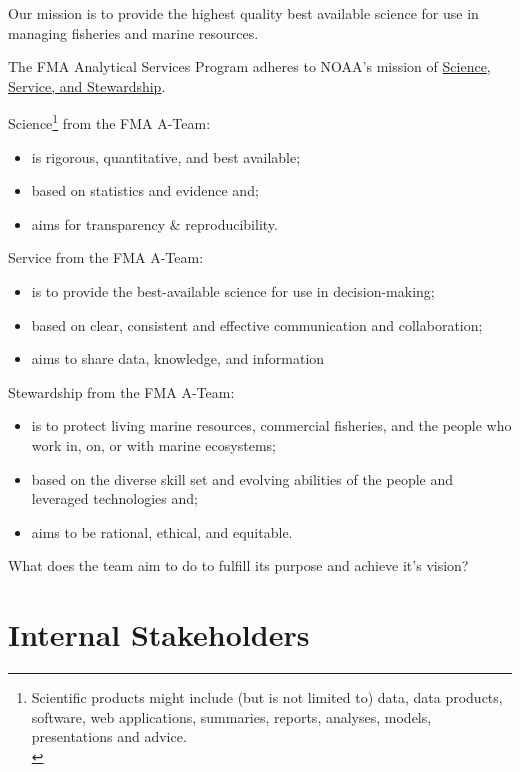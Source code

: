 \documentclass[
  letterpaper,
  DIV=11,
  numbers=noendperiod]{scrreprt}
\providecommand{\tightlist}{%
  \setlength{\itemsep}{0pt}\setlength{\parskip}{0pt}}\usepackage{longtable,booktabs,array}
\begin{document}
Our mission is to provide the highest quality best available science for
use in managing fisheries and marine resources.

The FMA Analytical Services Program adheres to NOAA's mission of
\href{https://www.noaa.gov/our-mission-and-vision}{Science, Service, and
Stewardship}.

Science\footnote{Scientific products might include (but is not limited
  to) data, data products, software, web applications, summaries,
  reports, analyses, models, presentations and advice.\\
} from the FMA A-Team:

\begin{itemize}
\tightlist
\item
  is rigorous, quantitative, and best available;
\item
  based on statistics and evidence and;
\item
  aims for transparency \& reproducibility.
\end{itemize}

Service from the FMA A-Team:

\begin{itemize}
\tightlist
\item
  is to provide the best-available science for use in decision-making;
\item
  based on clear, consistent and effective communication and
  collaboration;
\item
  aims to share data, knowledge, and information
\end{itemize}

Stewardship from the FMA A-Team:

\begin{itemize}
\tightlist
\item
  is to protect living marine resources, commercial fisheries, and the
  people who work in, on, or with marine ecosystems;
\item
  based on the diverse skill set and evolving abilities of the people
  and leveraged technologies and;
\item
  aims to be rational, ethical, and equitable.
\end{itemize}

What does the team aim to do to fulfill its purpose and achieve it's
vision?

\section{Internal Stakeholders}\label{subsec-stakeholders}
\end{document}
